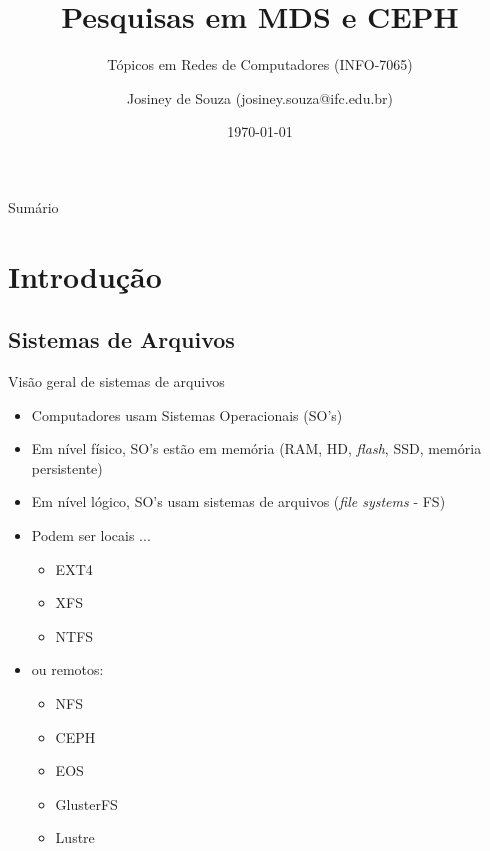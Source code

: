 \documentclass[xcolor=dvipsnames,table]{beamer}
\title{Pesquisas em MDS e CEPH}
\subtitle{Tópicos em Redes de Computadores (INFO-7065)}
\author{Josiney de Souza (josiney.souza@ifc.edu.br)}
\institute{UFPR / DInf}
\date{\today}
\begin{document}

\begin{frame}[plain]{}
    \maketitle
\end{frame}

{\small
\begin{frame}[plain]{Sumário}
	\begin{multicols}{2}
	\tableofcontents
	\end{multicols}
\end{frame}
}

\section{Introdução}
\subsection{Sistemas de Arquivos}
\begin{frame}{Visão geral de sistemas de arquivos}
	\begin{itemize}
		\item Computadores usam Sistemas Operacionais (SO's)
		\item Em nível físico, SO's estão em memória (RAM, HD, \textit{flash}, SSD, memória persistente)
		\item Em nível lógico, SO's usam sistemas de arquivos (\textit{file systems} - FS)
		\item Podem ser locais ...
		\begin{itemize}
			\item EXT4
			\item XFS
			\item NTFS
		\end{itemize} \pause
		\item ou remotos:
		\begin{itemize}
			\item NFS
			\item CEPH
			\item EOS
			\item GlusterFS
			\item Lustre
		\end{itemize}
	\end{itemize}
\end{frame}
\end{document}
